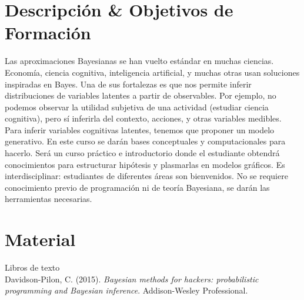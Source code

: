 \documentclass[letterpaper]{inzane_syllabus} %
\begin{document}

\makeprofile %


\section{Descripci\'on \& Objetivos de Formaci\'on}

Las aproximaciones Bayesianas se han vuelto est\'andar en muchas ciencias. Econom\'ia, ciencia cognitiva, inteligencia artificial, y muchas otras usan soluciones inspiradas en Bayes. Una de sus fortalezas es que nos permite inferir distribuciones de variables latentes a partir de observables. Por ejemplo, no podemos observar la utilidad subjetiva de una actividad (estudiar ciencia cognitiva), pero s\'i inferirla del contexto, acciones, y otras variables medibles. Para inferir variables cognitivas latentes, tenemos que proponer un modelo generativo. En este curso se dar\'an bases conceptuales y computacionales para hacerlo. Ser\'a un curso pr\'actico e introductorio donde el estudiante obtendr\'a conocimientos para estructurar hip\'otesis y plasmarlas en modelos gr\'aficos. Es interdisciplinar: estudiantes de diferentes \'areas son bienvenidos. No se requiere conocimiento previo de programaci\'on ni de teor\'ia Bayesiana, se dar\'an las herramientas necesarias.


\vspace{0.75cm} %
\section{Material}

{\color{myCOLOR}  Libros de texto}\\

Davidson-Pilon, C. (2015). \textit{Bayesian methods for hackers: probabilistic programming and Bayesian inference}. Addison-Wesley Professional.\\
\end{document}
